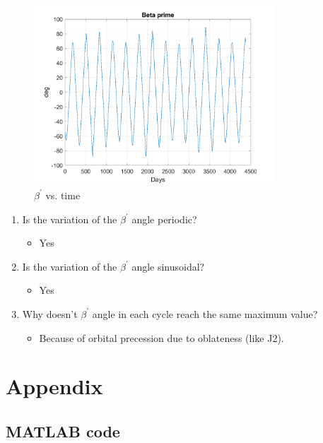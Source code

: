\documentclass[conf]{new-aiaa}
\begin{document}
\begin{figure}[h]
	\centering 
	\includegraphics[width=0.8\textwidth]{beta_prime.png}
	\caption{$\beta ^\prime$ vs. time}
\end{figure}


\begin{enumerate}
	\item Is the variation of the $\beta ^\prime$ angle periodic? 
	\begin{itemize}
		\item Yes
	\end{itemize}
	\item Is the variation of the $\beta ^\prime$ angle sinusoidal? 
	\begin{itemize}
		\item Yes 
	\end{itemize}
	\item Why doesn't $\beta ^\prime$ angle in each cycle reach the same maximum value? 
	\begin{itemize}
		\item Because of orbital precession due to oblateness (like J2).
	\end{itemize}
\end{enumerate}



\newpage
\section*{Appendix} 

\subsection*{MATLAB code} 
\end{document}
